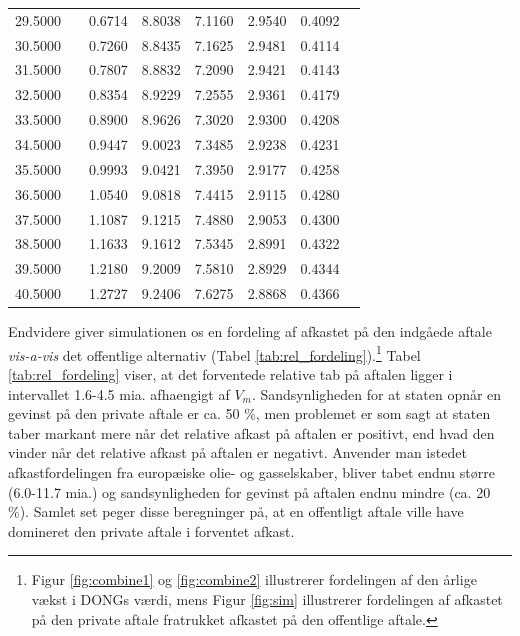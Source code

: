 \documentclass{article}
\begin{document}
\begin{table}[h]
\begin{tabularx}{0.95\linewidth}{cXcccccr}
 29.5000&&0.6714&8.8038&7.1160&2.9540&0.4092\\
 30.5000&&0.7260&8.8435&7.1625&2.9481&0.4114\\
 31.5000&&0.7807&8.8832&7.2090&2.9421&0.4143\\
 32.5000&&0.8354&8.9229&7.2555&2.9361&0.4179\\
 33.5000&&0.8900&8.9626&7.3020&2.9300&0.4208\\
 34.5000&&0.9447&9.0023&7.3485&2.9238&0.4231\\
 35.5000&&0.9993&9.0421&7.3950&2.9177&0.4258\\
 36.5000&&1.0540&9.0818&7.4415&2.9115&0.4280\\
 37.5000&&1.1087&9.1215&7.4880&2.9053&0.4300\\
 38.5000&&1.1633&9.1612&7.5345&2.8991&0.4322\\
 39.5000&&1.2180&9.2009&7.5810&2.8929&0.4344\\
 40.5000&&1.2727&9.2406&7.6275&2.8868&0.4366\\

\bottomrule[1pt]
	\end{tabularx}
	\begin{minipage}{\linewidth}
	\end{minipage}
\end{table}


Endvidere giver simulationen os en fordeling af afkastet på den indgåede aftale \emph{vis-a-vis} det offentlige alternativ (Tabel \ref{tab:rel_fordeling}).\footnote{Figur \ref{fig:combine1} og \ref{fig:combine2} illustrerer fordelingen af den årlige vækst i DONGs værdi, mens Figur \ref{fig:sim} illustrerer fordelingen af afkastet på den private aftale fratrukket afkastet på den offentlige aftale.} Tabel \ref{tab:rel_fordeling} viser, at det forventede relative tab på aftalen ligger i intervallet 1.6-4.5 mia. afhaengigt af $V_m$. Sandsynligheden for at staten opnår en gevinst på den private aftale er ca. 50 \%, men problemet er som sagt at staten taber markant mere når det relative afkast på aftalen er positivt, end hvad den vinder når det relative afkast på aftalen er negativt. Anvender man istedet afkastfordelingen fra europæiske olie- og gasselskaber, bliver tabet endnu større (6.0-11.7 mia.) og sandsynligheden for gevinst på aftalen endnu mindre (ca. 20  \%). Samlet set peger disse beregninger på, at en offentligt aftale ville have domineret den private aftale i forventet afkast.
\end{document}
